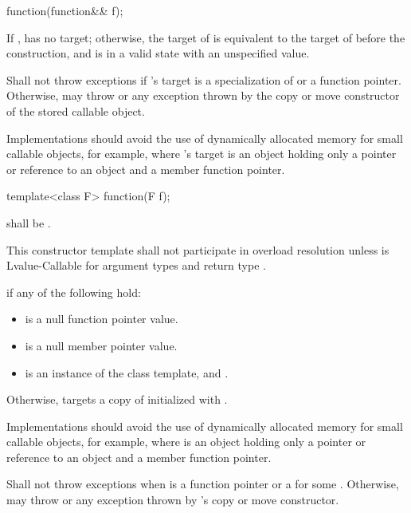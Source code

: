 %
\begin{itemdecl}
function(function&& f);
\end{itemdecl}

\begin{itemdescr}
\pnum
\postconditions If ,  has no target;
otherwise, the target of  is equivalent to
the target of  before the construction, and
 is in a valid state with an unspecified value.

\pnum
\throws Shall not throw exceptions if 's target is
a specialization of  or
a function pointer. Otherwise, may throw  or
any exception thrown by the copy or move constructor
of the stored callable object.
\begin{note} Implementations should avoid the use of
dynamically allocated memory for small callable objects, for example,
where 's target is an object holding only a pointer or reference
to an object and a member function pointer. \end{note}
\end{itemdescr}

%
\begin{itemdecl}
template<class F> function(F f);
\end{itemdecl}

\begin{itemdescr}
\pnum
\requires {} shall be .

\pnum
\remarks This constructor template shall not participate in overload resolution unless
 is Lvalue-Callable for argument types
 and return type .

\pnum
\postconditions {} if any of the following hold:
\begin{itemize}
\item {} is a null function pointer value.
\item {} is a null member pointer value.
\item {} is an instance of the  class template, and
  .
\end{itemize}

\pnum
Otherwise,  targets a copy of 
initialized with .
\begin{note} Implementations should avoid the use of
dynamically allocated memory for small callable objects, for example,
where  is an object holding only a pointer or
reference to an object and a member function pointer. \end{note}

\pnum
\throws Shall not throw exceptions when  is a function pointer
or a  for some . Otherwise,
may throw  or any exception thrown by 's copy
or move constructor.
\end{itemdescr}


